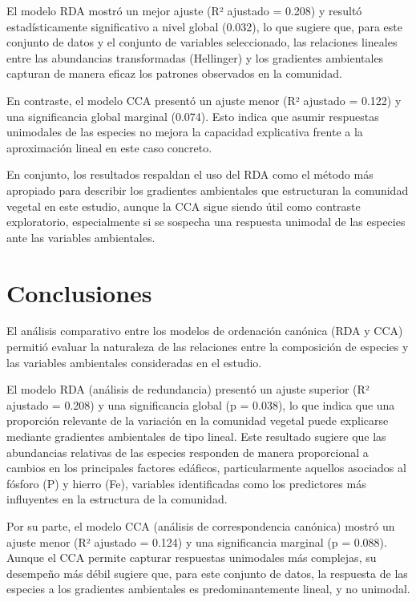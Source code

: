 \documentclass[
  spanish,
  11pt,
  a4paper,
  DIV=11,
  numbers=noendperiod]{scrartcl}
\begin{document}
El modelo RDA mostró un mejor ajuste (R² ajustado = 0.208) y resultó
estadísticamente significativo a nivel global (0.032), lo que sugiere
que, para este conjunto de datos y el conjunto de variables
seleccionado, las relaciones lineales entre las abundancias
transformadas (Hellinger) y los gradientes ambientales capturan de
manera eficaz los patrones observados en la comunidad.

En contraste, el modelo CCA presentó un ajuste menor (R² ajustado =
0.122) y una significancia global marginal (0.074). Esto indica que
asumir respuestas unimodales de las especies no mejora la capacidad
explicativa frente a la aproximación lineal en este caso concreto.

En conjunto, los resultados respaldan el uso del RDA como el método más
apropiado para describir los gradientes ambientales que estructuran la
comunidad vegetal en este estudio, aunque la CCA sigue siendo útil como
contraste exploratorio, especialmente si se sospecha una respuesta
unimodal de las especies ante las variables ambientales.

\section{Conclusiones}\label{conclusiones}

El análisis comparativo entre los modelos de ordenación canónica (RDA y
CCA) permitió evaluar la naturaleza de las relaciones entre la
composición de especies y las variables ambientales consideradas en el
estudio.

El modelo RDA (análisis de redundancia) presentó un ajuste superior (R²
ajustado = 0.208) y una significancia global (p = 0.038), lo que indica
que una proporción relevante de la variación en la comunidad vegetal
puede explicarse mediante gradientes ambientales de tipo lineal. Este
resultado sugiere que las abundancias relativas de las especies
responden de manera proporcional a cambios en los principales factores
edáficos, particularmente aquellos asociados al fósforo (P) y hierro
(Fe), variables identificadas como los predictores más influyentes en la
estructura de la comunidad.

Por su parte, el modelo CCA (análisis de correspondencia canónica)
mostró un ajuste menor (R² ajustado = 0.124) y una significancia
marginal (p = 0.088). Aunque el CCA permite capturar respuestas
unimodales más complejas, su desempeño más débil sugiere que, para este
conjunto de datos, la respuesta de las especies a los gradientes
ambientales es predominantemente lineal, y no unimodal.
\end{document}
